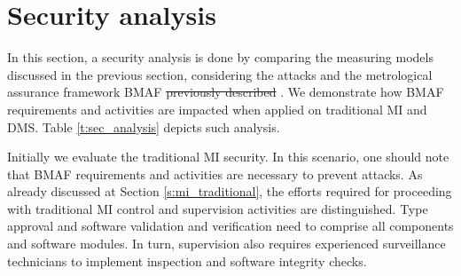 \documentclass[journal]{IEEEtran} %
\providecommand{\DIFadd}[1]{{\protect\color{blue}\uwave{#1}}} %
\providecommand{\DIFdel}[1]{{\protect\color{red}\sout{#1}}}                      %
\providecommand{\DIFaddbegin}{} %
\providecommand{\DIFaddend}{} %
\providecommand{\DIFdelbegin}{} %
\providecommand{\DIFdelend}{} %
\begin{document}

\section{Security analysis}
\label{s:sec_analysis}
In this section, a security analysis is done by comparing the measuring models discussed in the previous section, considering the attacks and the metrological assurance framework BMAF \DIFdelbegin \DIFdel{previously described }\DIFdelend \DIFaddbegin \DIFadd{described previously}\DIFaddend . 
We demonstrate how BMAF requirements and activities are impacted when applied on traditional MI and DMS. 
Table \ref{t:sec_analysis} depicts such analysis.

Initially we evaluate the traditional MI security. In this scenario, one should note that BMAF requirements and activities are  necessary to prevent attacks. As already discussed at Section \ref{s:mi_traditional}, the efforts required for proceeding with traditional MI control and supervision activities are distinguished. Type approval and software validation and verification need to comprise all components and software modules. In turn, supervision also requires experienced surveillance technicians to implement inspection and software integrity checks.
\end{document}
